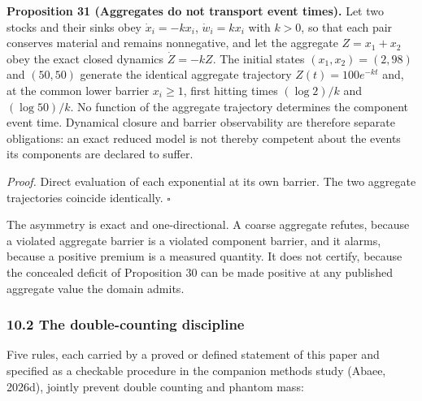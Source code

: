 \documentclass[11pt]{article}
\begin{document}
\textbf{Proposition 31 (Aggregates do not transport event times).} Let two stocks and their sinks obey
\(\dot x_i=-kx_i\), \(\dot w_i=kx_i\) with \(k>0\), so that each pair conserves material and remains
nonnegative, and let the aggregate \(Z=x_1+x_2\) obey the exact closed dynamics \(\dot Z=-kZ\). The
initial states \((x_1,x_2)=(2,98)\) and \((50,50)\) generate the identical aggregate trajectory
\(Z(t)=100e^{-kt}\) and, at the common lower barrier \(x_i\ge1\), first hitting times \((\log2)/k\)
and \((\log50)/k\). No function of the aggregate trajectory determines the component event time.
Dynamical closure and barrier observability are therefore separate obligations: an exact reduced
model is not thereby competent about the events its components are declared to suffer.

\emph{Proof.} Direct evaluation of each exponential at its own barrier. The two aggregate trajectories coincide identically. \ensuremath{\square}

The asymmetry is exact and one-directional. A coarse aggregate refutes, because a violated aggregate barrier is a violated component barrier, and it alarms, because a positive premium is a measured quantity. It does not certify, because the concealed deficit of Proposition 30 can be made positive at any published aggregate value the domain admits.


\subsubsection{10.2 The double-counting
discipline}\label{the-double-counting-discipline}

Five rules, each carried by a proved or defined statement of this paper and specified as a checkable procedure in the companion methods study (Abaee, 2026d), jointly prevent double counting and phantom mass:
\end{document}
